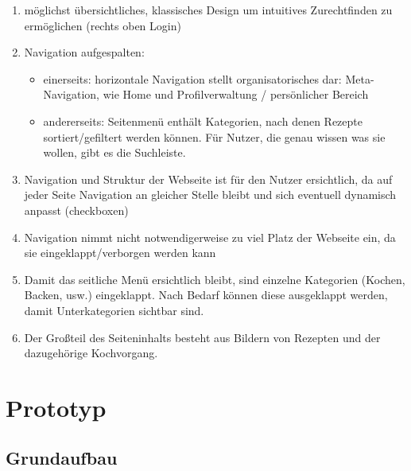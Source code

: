 \documentclass[parskip,10pt,abstracton]{scrartcl}
\begin{document}
\begin{enumerate}
 \item möglichst übersichtliches, klassisches Design um intuitives Zurechtfinden zu ermöglichen (rechts oben Login)
 \item Navigation aufgespalten:
 \begin{itemize}
  \item einerseits: horizontale Navigation stellt organisatorisches dar: Meta-Navigation, wie Home und Profilverwaltung / persönlicher Bereich
  \item andererseits: Seitenmenü enthält Kategorien, nach denen Rezepte sortiert/gefiltert werden können. Für Nutzer, die genau wissen was sie wollen, gibt es die Suchleiste.
 \end{itemize}
 \item Navigation und Struktur der Webseite ist für den Nutzer ersichtlich, da auf jeder Seite Navigation an gleicher Stelle bleibt und sich eventuell dynamisch anpasst (checkboxen)
 \item Navigation nimmt nicht notwendigerweise zu viel Platz der Webseite ein, da sie eingeklappt/verborgen werden kann
 \item Damit das seitliche Menü ersichtlich bleibt, sind einzelne Kategorien (Kochen, Backen, usw.) eingeklappt. Nach Bedarf können diese ausgeklappt werden, damit Unterkategorien sichtbar sind. 
 \item Der Großteil des Seiteninhalts besteht aus Bildern von Rezepten und der dazugehörige Kochvorgang.

\end{enumerate}



\pagebreak
\section{Prototyp}


\subsection*{Grundaufbau}
\end{document}
